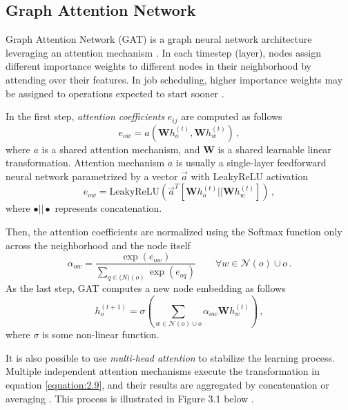 \subsection{Graph Attention Network}
Graph Attention Network (GAT) is a graph neural network architecture leveraging an attention mechanism \cite{veličković2018graph}. In each timestep (layer), nodes assign different importance weights to different nodes in their neighborhood by attending over their features. In job scheduling, higher importance weights may be assigned to operations expected to start sooner \cite{9826438}.  
\newpage
\par
In the first step, \textit{attention coefficients} $e_{ij}$ are computed as follows \cite{9826438, veličković2018graph}
\begin{equation} \label{equation:2.6}
	e_{ow} = a\left ( \boldsymbol{W} h_o^{(t)}, \boldsymbol{W} h_w^{(t)}  \right ) \, ,
\end{equation}  
where $a$ is a shared attention mechanism, and $\boldsymbol{W}$ is a shared learnable linear transformation. Attention mechanism $a$ is usually a single-layer feedforward neural network parametrized by a vector $\vec{a}$ with LeakyReLU activation \cite{9826438, veličković2018graph, DBLP:journals/corr/abs-2105-14491}
\begin{equation} \label{equation:2.7}
	e_{ow} = \text{LeakyReLU}\left ( \vec{a}^T \left [ \boldsymbol{W}h_o^{(t)} || \boldsymbol{W}h_w^{(t)} \right ] \right ) \, ,
\end{equation}
where $\bullet||\bullet$ represents concatenation.
\par
Then, the attention coefficients are normalized using the Softmax function only across the neighborhood and the node itself \cite{9826438, veličković2018graph}
\begin{equation}
	\alpha_{ow} = \frac{\exp(e_{ow})}{\sum_{q \in \mathcal(N)(o)} \exp(e_{oq})} \hspace{2em} \forall w \in \mathcal{N}(o) \cup {o} \, .
\end{equation}
As the last step, GAT computes a new node embedding as follows \cite{9826438, veličković2018graph}
\begin{equation} \label{equation:2.9}
	h_o^{(t+1)} = \sigma \left ( \sum_{w \in \mathcal{N}(o) \cup {o}} \alpha_{ow} \boldsymbol{W} h_w^{(t)} \right ) \, ,
\end{equation}
where $\sigma$ is some non-linear function. 
\par
It is also possible to use \textit{multi-head attention} to stabilize the learning process. Multiple independent attention mechanisms execute the transformation in equation \ref{equation:2.9}, and their results are aggregated by concatenation or averaging \cite{veličković2018graph}. This process is illustrated in Figure 3.1 below \cite{veličković2018graph}.

